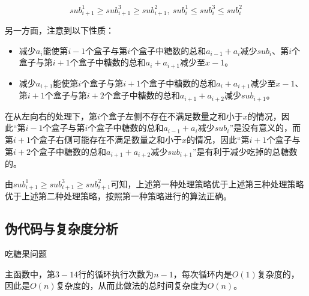 \documentclass{article}
\begin{document}
$$
sub^1_{i+1}\ge{sub}^3_{i+1}\ge{sub}^2_{i+1},\ sub^1_i\le{sub}^3_i\le{sub}^2_i
$$

另一方面，注意到以下性质：

\begin{itemize}[itemindent=3em]
    \item 减少$a_i$能使第$i-1$个盒子与第$i$个盒子中糖数的总和$a_{i-1}+a_i$减少$sub_i$、第$i$个盒子与第$i+1$个盒子中糖数的总和$a_i+a_{i+1}$减少至$x-1$。
    \item 减少$a_{i+1}$能使第$i$个盒子与第$i+1$个盒子中糖数的总和$a_i+a_{i+1}$减少至$x-1$、第$i+1$个盒子与第$i+2$个盒子中糖数的总和$a_{i+1}+a_{i+2}$减少$sub_{i+1}$。
\end{itemize}

在从左向右的处理下，第$i$个盒子左侧不存在不满足数量之和小于$x$的情况，因此“第$i-1$个盒子与第$i$个盒子中糖数的总和$a_{i-1}+a_i$减少$sub_i$”是没有意义的，而第$i+1$个盒子右侧可能存在不满足数量之和小于$x$的情况，因此“第$i+1$个盒子与第$i+2$个盒子中糖数的总和$a_{i+1}+a_{i+2}$减少$sub_{i+1}$”是有利于减少吃掉的总糖数的。

由$sub^1_{i+1}\ge{sub}^3_{i+1}\ge{sub}^2_{i+1}$可知，上述第一种处理策略优于上述第三种处理策略优于上述第二种处理策略，按照第一种策略进行的算法正确。

\subsection{伪代码与复杂度分析}

\begin{algorithm}[H]

\caption{吃糖果问题}
\LinesNumbered
{}


\end{algorithm}

主函数中，第$3-14$行的循环执行次数为$n-1$，每次循环内是$O(1)$复杂度的，因此是$O(n)$复杂度的，从而此做法的总时间复杂度为$O(n)$。
\end{document}
